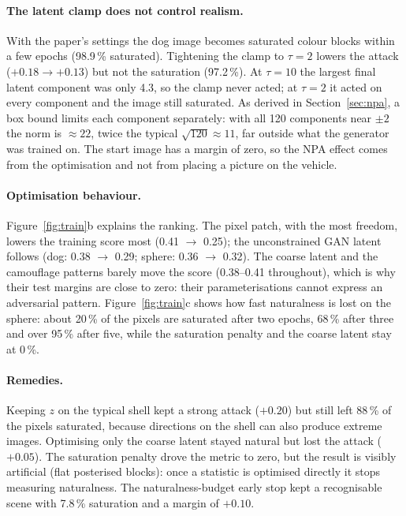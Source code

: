 \documentclass[11pt,a4paper]{article}
\begin{document}
\paragraph{The latent clamp does not control realism.} With the paper's settings the dog image becomes saturated colour blocks within a few epochs (98.9\,\% saturated). Tightening the clamp to $\tau=2$ lowers the attack ($+0.18\to+0.13$) but not the saturation (97.2\,\%). At $\tau=10$ the largest final latent component was only 4.3, so the clamp never acted; at $\tau=2$ it acted on every component and the image still saturated. As derived in Section~\ref{sec:npa}, a box bound limits each component separately: with all 120 components near $\pm2$ the norm is $\approx22$, twice the typical $\sqrt{120}\approx11$, far outside what the generator was trained on. The start image has a margin of zero, so the NPA effect comes from the optimisation and not from placing a picture on the vehicle.

\paragraph{Optimisation behaviour.} Figure~\ref{fig:train}b explains the ranking. The pixel patch, with the most freedom, lowers the training score most (0.41 $\to$ 0.25); the unconstrained GAN latent follows (dog: 0.38 $\to$ 0.29; sphere: 0.36 $\to$ 0.32). The coarse latent and the camouflage patterns barely move the score (0.38--0.41 throughout), which is why their test margins are close to zero: their parameterisations cannot express an adversarial pattern. Figure~\ref{fig:train}c shows how fast naturalness is lost on the sphere: about 20\,\% of the pixels are saturated after two epochs, 68\,\% after three and over 95\,\% after five, while the saturation penalty and the coarse latent stay at 0\,\%.

\paragraph{Remedies.} Keeping $z$ on the typical shell kept a strong attack ($+0.20$) but still left 88\,\% of the pixels saturated, because directions on the shell can also produce extreme images. Optimising only the coarse latent stayed natural but lost the attack ($+0.05$). The saturation penalty drove the metric to zero, but the result is visibly artificial (flat posterised blocks): once a statistic is optimised directly it stops measuring naturalness. The naturalness-budget early stop kept a recognisable scene with 7.8\,\% saturation and a margin of $+0.10$.
\end{document}
